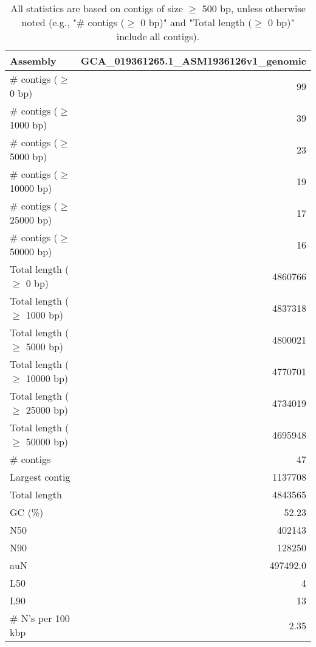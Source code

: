 \documentclass[12pt,a4paper]{article}
\begin{document}
\begin{table}[ht]
\begin{center}
\caption{All statistics are based on contigs of size $\geq$ 500 bp, unless otherwise noted (e.g., "\# contigs ($\geq$ 0 bp)" and "Total length ($\geq$ 0 bp)" include all contigs).}
\begin{tabular}{|l*{1}{|r}|}
\hline
Assembly & GCA\_019361265.1\_ASM1936126v1\_genomic \\ \hline
\# contigs ($\geq$ 0 bp) & 99 \\ \hline
\# contigs ($\geq$ 1000 bp) & 39 \\ \hline
\# contigs ($\geq$ 5000 bp) & 23 \\ \hline
\# contigs ($\geq$ 10000 bp) & 19 \\ \hline
\# contigs ($\geq$ 25000 bp) & 17 \\ \hline
\# contigs ($\geq$ 50000 bp) & 16 \\ \hline
Total length ($\geq$ 0 bp) & 4860766 \\ \hline
Total length ($\geq$ 1000 bp) & 4837318 \\ \hline
Total length ($\geq$ 5000 bp) & 4800021 \\ \hline
Total length ($\geq$ 10000 bp) & 4770701 \\ \hline
Total length ($\geq$ 25000 bp) & 4734019 \\ \hline
Total length ($\geq$ 50000 bp) & 4695948 \\ \hline
\# contigs & 47 \\ \hline
Largest contig & 1137708 \\ \hline
Total length & 4843565 \\ \hline
GC (\%) & 52.23 \\ \hline
N50 & 402143 \\ \hline
N90 & 128250 \\ \hline
auN & 497492.0 \\ \hline
L50 & 4 \\ \hline
L90 & 13 \\ \hline
\# N's per 100 kbp & 2.35 \\ \hline
\end{tabular}
\end{center}
\end{table}
\end{document}
